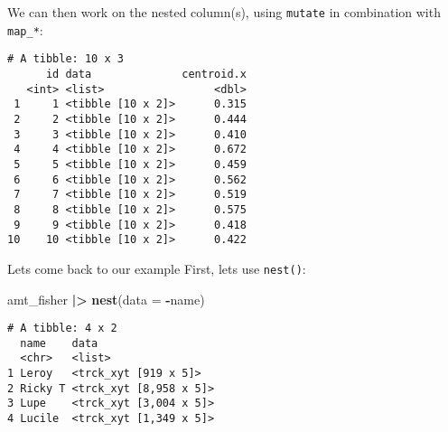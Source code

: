 \documentclass[ignorenonframetext,,t]{beamer}
\let\oldtextbf\textbf
\renewcommand{\textbf}[1]{\textcolor{spamwell}{\oldtextbf{#1}}}
\newenvironment{Shaded}{\begin{snugshade}}{\end{snugshade}}
\newcommand{\AttributeTok}[1]{\textcolor[rgb]{0.13,0.29,0.53}{#1}}
\newcommand{\FunctionTok}[1]{\textcolor[rgb]{0.13,0.29,0.53}{\textbf{#1}}}
\newcommand{\NormalTok}[1]{#1}
\newcommand{\SpecialCharTok}[1]{\textcolor[rgb]{0.81,0.36,0.00}{\textbf{#1}}}
\begin{document}
\begin{frame}[fragile]
We can then work on the nested column(s), using \texttt{mutate} in
combination with \texttt{map\_*}:

\begin{Shaded}
\end{Shaded}

\begin{verbatim}
# A tibble: 10 x 3
      id data              centroid.x
   <int> <list>                 <dbl>
 1     1 <tibble [10 x 2]>      0.315
 2     2 <tibble [10 x 2]>      0.444
 3     3 <tibble [10 x 2]>      0.410
 4     4 <tibble [10 x 2]>      0.672
 5     5 <tibble [10 x 2]>      0.459
 6     6 <tibble [10 x 2]>      0.562
 7     7 <tibble [10 x 2]>      0.519
 8     8 <tibble [10 x 2]>      0.575
 9     9 <tibble [10 x 2]>      0.418
10    10 <tibble [10 x 2]>      0.422
\end{verbatim}
\end{frame}

\begin{frame}[fragile]
\begin{block}{Lets come back to our example}
\label{lets-come-back-to-our-example}
First, lets use \texttt{nest()}:

\begin{Shaded}
\begin{Highlighting}[]
\NormalTok{amt\_fisher }\SpecialCharTok{|\textgreater{}} \FunctionTok{nest}\NormalTok{(}\AttributeTok{data =} \SpecialCharTok{{-}}\NormalTok{name)}
\end{Highlighting}
\end{Shaded}

\begin{verbatim}
# A tibble: 4 x 2
  name    data                  
  <chr>   <list>                
1 Leroy   <trck_xyt [919 x 5]>  
2 Ricky T <trck_xyt [8,958 x 5]>
3 Lupe    <trck_xyt [3,004 x 5]>
4 Lucile  <trck_xyt [1,349 x 5]>
\end{verbatim}
\end{block}
\end{frame}
\end{document}
